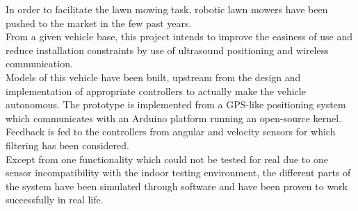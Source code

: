 In order to facilitate the lawn mowing task, robotic lawn mowers have been pushed to the market in the few past years.\\
From a given vehicle base, this project intends to improve the easiness of use and reduce installation constraints by use of ultrasound positioning and wireless communication.\\
Models of this vehicle have been built, upstream from the design and implementation of appropriate controllers to actually make the vehicle autonomous. The prototype is implemented from a GPS-like positioning system which communicates with an Arduino platform running an open-source kernel. Feedback is fed to the controllers from angular and velocity sensors for which filtering has been considered.\\
Except from one functionality which could not be tested for real due to one sensor incompatibility with the indoor testing environment, the different parts of the system have been simulated through software and have been proven to work successfully in real life.